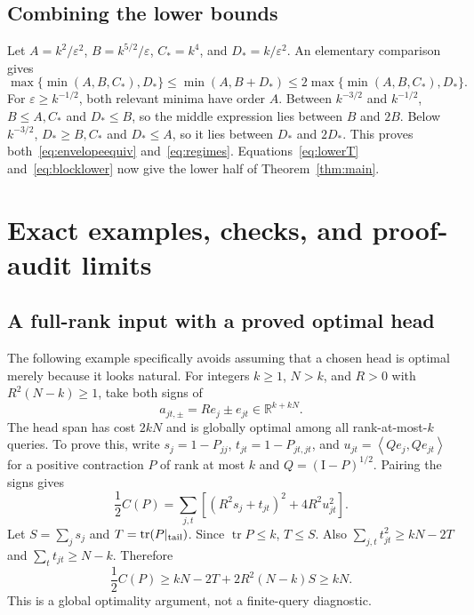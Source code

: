 \documentclass[11pt]{article}
\theoremstyle{remark}\newtheorem{remark}[theorem]{Remark}
\newcommand{\R}{\mathbb R}\newcommand{\E}{\mathbb E}\newcommand{\Prob}{\mathbb P}
\newcommand{\Tr}{\operatorname{tr}}\newcommand{\rank}{\operatorname{rank}}
\newcommand{\ip}[2]{\left\langle#1,#2\right\rangle}
\newcommand{\Id}{\mathrm I}\newcommand{\dbar}{\bar d}
\numberwithin{equation}{section}
\begin{document}
\subsection{Combining the lower bounds}
Let $A=k^2/\varepsilon^2$, $B=k^{5/2}/\varepsilon$, $C_*=k^4$, and $D_*=k/\varepsilon^2$. An elementary comparison gives
\begin{equation}\label{eq:envelopeequiv}
 \max\{\min(A,B,C_*),D_*\}
 \le\min(A,B+D_*)\le2\max\{\min(A,B,C_*),D_*\}.
\end{equation}
For $\varepsilon\ge k^{-1/2}$, both relevant minima have order $A$. Between $k^{-3/2}$ and $k^{-1/2}$, $B\le A,C_*$ and $D_*\le B$, so the middle expression lies between $B$ and $2B$. Below $k^{-3/2}$, $D_*\ge B,C_*$ and $D_*\le A$, so it lies between $D_*$ and $2D_*$. This proves both~\eqref{eq:envelopeequiv} and~\eqref{eq:regimes}. Equations~\eqref{eq:lowerT} and~\eqref{eq:blocklower} now give the lower half of Theorem~\ref{thm:main}.

\section{Exact examples, checks, and proof-audit limits}\label{sec:checks}
\subsection{A full-rank input with a proved optimal head}
The following example specifically avoids assuming that a chosen head is optimal merely because it looks natural. For integers $k\ge1$, $N>k$, and $R>0$ with $R^2(N-k)\ge1$, take both signs of
\begin{equation}\label{eq:certrows}
 a_{jt,\pm}=Re_j\pm e_{jt}\in\R^{k+kN}.
\end{equation}
The head span has cost $2kN$ and is globally optimal among all rank-at-most-$k$ queries. To prove this, write $s_j=1-P_{jj}$, $t_{jt}=1-P_{jt,jt}$, and $u_{jt}=\ip{Qe_j}{Qe_{jt}}$ for a positive contraction $P$ of rank at most $k$ and $Q=(\Id-P)^{1/2}$. Pairing the signs gives
\[
 \frac12 C(P)=\sum_{j,t}\left[(R^2s_j+t_{jt})^2+4R^2u_{jt}^2\right].
\]
Let $S=\sum_j s_j$ and $T=\Tr(P|_{\rm tail})$. Since $\Tr P\le k$, $T\le S$. Also
$\sum_{j,t}t_{jt}^2\ge kN-2T$ and $\sum_t t_{jt}\ge N-k$. Therefore
\[
 \frac12 C(P)\ge kN-2T+2R^2(N-k)S\ge kN.
\]
This is a global optimality argument, not a finite-query diagnostic.
\end{document}
